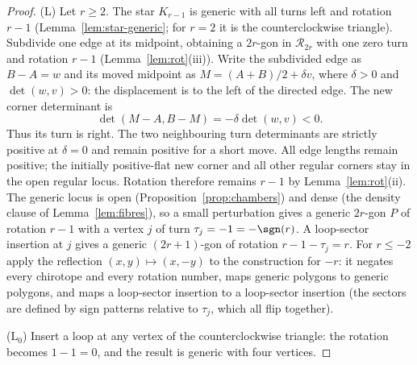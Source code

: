 \begin{proof}
(L) Let $r\geq2$. The star $K_{r-1}$ is generic with all turns left and
rotation $r-1$ (Lemma~\ref{lem:star-generic}; for $r=2$ it is the
counterclockwise triangle). Subdivide one edge at its midpoint, obtaining a
$2r$-gon in $\mathcal R_{2r}$ with one zero turn and rotation $r-1$
(Lemma~\ref{lem:rot}(iii)). Write the subdivided edge as $B-A=w$
and its moved midpoint as $M=(A+B)/2+\delta v$, where $\delta>0$
and $\det(w,v)>0$: the displacement is to the left of the directed edge.
The new corner determinant is
\begin{equation}\label{eq:anchor-midpoint-turn}
\det(M-A,B-M)=-\delta\det(w,v)<0.
\end{equation}
Thus its turn is right. The two neighbouring turn determinants are
strictly positive at $\delta=0$ and remain positive for a short move.
All edge lengths remain positive; the initially positive-flat new
corner and all other regular corners stay in the open regular locus.
Rotation therefore remains $r-1$ by Lemma~\ref{lem:rot}(ii). The
generic locus is open (Proposition~\ref{prop:chambers}) and dense (the
density clause of Lemma~\ref{lem:fibres}), so a
small perturbation gives a generic $2r$-gon $P$ of rotation $r-1$ with a
vertex $j$ of turn $\tau_j=-1=-\sgn(r)$. A loop-sector insertion at $j$ gives
a generic $(2r+1)$-gon of rotation $r-1-\tau_j=r$. For $r\leq-2$ apply the
reflection $(x,y)\mapsto(x,-y)$ to the construction for $-r$: it negates every
chirotope and every rotation number, maps generic polygons to generic
polygons, and maps a loop-sector insertion to a loop-sector insertion (the
sectors are defined by sign patterns relative to $\tau_j$, which all flip
together).

(L$_0$) Insert a loop at any vertex of the counterclockwise triangle: the
rotation becomes $1-1=0$, and the result is generic with four vertices.
\end{proof}

